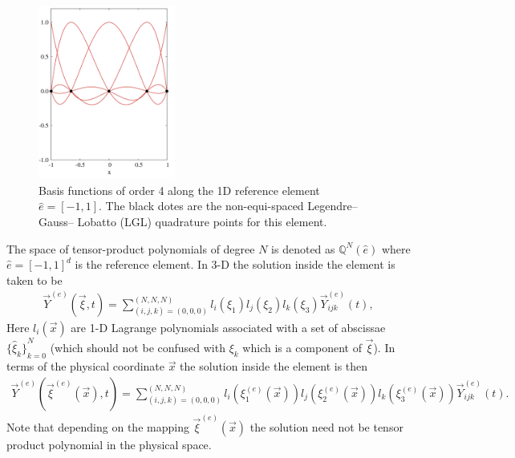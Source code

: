 \documentclass{report}
\numberwithin{equation}{section}
\begin{document}
 
 \begin{figure}[htbp]
\centering
\includegraphics[width=0.4\textwidth]{CLIMA-numerics/figures/LGL-lagrange.png}
\caption{Basis functions of order 4 along the 1D reference element $\hat{e} = [-1,1]$. The black dotes are the non-equi-spaced Legendre–Gauss– Lobatto (LGL) quadrature points for this element.}
\label{fig:LGL}
\end{figure}

The space of tensor-product polynomials of degree $N$
is denoted as $\mathbb{Q}^{N}(\hat{e})$ where $\hat{e} = {[-1, 1]}^d$ is the reference element. In 3-D the solution inside the element is taken to be
\begin{align}
  \vec{Y}^{(e)}(\vec{\xi}, t) = \sum_{(i,j,k) = (0,0,0)}^{(N,N,N)}
  l_{i}(\xi_{1}) l_{j}(\xi_{2}) l_{k}(\xi_{3})
  \vec{Y}_{ijk}^{(e)}(t),
\end{align}
Here $l_{i}(\vec{x})$ are 1-D Lagrange polynomials associated with a set of
abscissae ${\{\hat{\xi}_{k}\}}_{k=0}^{N}$ (which should not be confused with
$\xi_{k}$ which is a component of $\vec{\xi}$). In terms of the physical
coordinate $\vec{x}$ the solution inside the element is then
\begin{align}
  \vec{Y}^{(e)}(\vec{\xi}^{(e)}(\vec{x}), t) = \sum_{(i,j,k) = (0,0,0)}^{(N,N,N)}
  l_{i}(\xi_{1}^{(e)}(\vec{x})) l_{j}(\xi_{2}^{(e)}(\vec{x}))
  l_{k}(\xi_{3}^{(e)}(\vec{x}))
  \vec{Y}_{ijk}^{(e)}(t).
\end{align}
Note that depending on the mapping $\vec{\xi}^{(e)}(\vec{x})$ the solution need
not be tensor product polynomial in the physical space.
\end{document}
